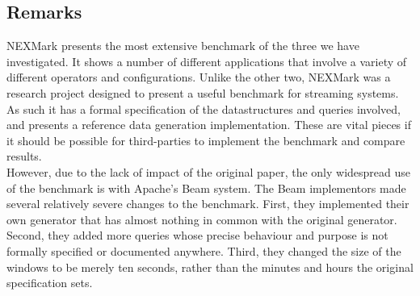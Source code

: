 

\subsection{Remarks}\label{section:nexmark-remarks}
NEXMark presents the most extensive benchmark of the three we have investigated. It shows a number of different applications that involve a variety of different operators and configurations. Unlike the other two, NEXMark was a research project designed to present a useful benchmark for streaming systems. As such it has a formal specification of the datastructures and queries involved, and presents a reference data generation implementation. These are vital pieces if it should be possible for third-parties to implement the benchmark and compare results. \\

However, due to the lack of impact of the original paper, the only widespread use of the benchmark is with Apache's Beam system. The Beam implementors made several relatively severe changes to the benchmark. First, they implemented their own generator that has almost nothing in common with the original generator. Second, they added more queries whose precise behaviour and purpose is not formally specified or documented anywhere. Third, they changed the size of the windows to be merely ten seconds, rather than the minutes and hours the original specification sets. \\

